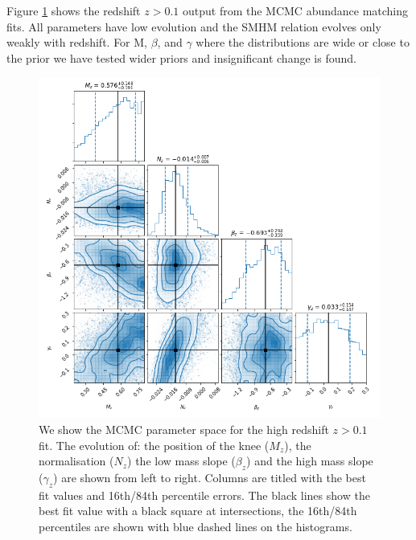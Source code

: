 Figure \ref{fig:MCMC_hz} shows the redshift $z > 0.1$ output from the MCMC abundance matching fits. All parameters have low evolution and the SMHM relation evolves only weakly with redshift. For M, $\beta$, and $\gamma$ where the distributions are wide  or close to the prior we have tested wider priors and insignificant change is found.

\begin{figure}
	\centering
	\includegraphics[width = \linewidth]{Appendices/AbnMCMC/MCMC_plot_hz.png}
    \caption{We show the MCMC parameter space for the high redshift $z > 0.1$ fit. The evolution of: the position of the knee ($M_z$), the normalisation ($N_z$) the low mass slope ($\beta_z$) and the high mass slope ($\gamma_z$) are shown from left to right. Columns are titled with the best fit values and 16th/84th percentile errors. The black lines show the best fit value with a black square at intersections, the 16th/84th percentiles are shown with blue dashed lines on the histograms.}
	\label{fig:MCMC_hz}
\end{figure}
